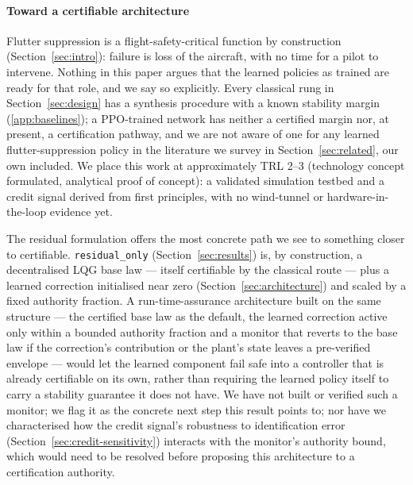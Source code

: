 \documentclass[preprint,11pt,authoryear]{elsarticle}
\begin{document}
\paragraph{Toward a certifiable architecture}
Flutter suppression is a flight-safety-critical function by construction
(Section~\ref{sec:intro}): failure is loss of the aircraft, with no time for a
pilot to intervene. Nothing in this paper argues that the learned policies as
trained are ready for that role, and we say so explicitly. Every classical rung
in Section~\ref{sec:design} has a synthesis procedure with a known stability
margin (\ref{app:baselines}); a PPO-trained network has neither a certified
margin nor, at present, a certification pathway, and we are not aware of one
for any learned flutter-suppression policy in the literature we survey in
Section~\ref{sec:related}, our own included. We place this work at approximately
TRL 2--3 (technology concept formulated, analytical proof of concept): a
validated simulation testbed and a credit signal derived from first principles,
with no wind-tunnel or hardware-in-the-loop evidence yet.

The residual formulation offers the most concrete path we see to something
closer to certifiable. \texttt{residual\_only} (Section~\ref{sec:results}) is,
by construction, a decentralised LQG base law --- itself certifiable by the
classical route --- plus a learned correction initialised near zero
(Section~\ref{sec:architecture}) and scaled by a fixed authority fraction. A
run-time-assurance architecture built on the same structure --- the certified
base law as the default, the learned correction active only within a bounded
authority fraction and a monitor that reverts to the base law if the
correction's contribution or the plant's state leaves a pre-verified envelope
--- would let the learned component fail safe into a controller that is
already certifiable on its own, rather than requiring the learned policy
itself to carry a stability guarantee it does not have. We have not built or
verified such a monitor; we flag it as the concrete next step this result
points to; nor have we characterised how the credit signal's robustness to
identification error (Section~\ref{sec:credit-sensitivity}) interacts with the
monitor's authority bound, which would need to be resolved before proposing
this architecture to a certification authority.
\end{document}
